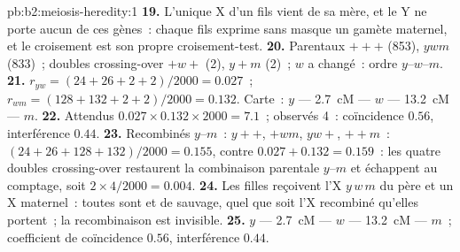 \begin{solution}{pb:b2:meiosis-heredity:1}
\textbf{19.} L'unique X d'un fils vient de sa mère, et le Y ne porte
aucun de ces gènes~: chaque fils exprime sans masque un gamète maternel,
et le croisement est son propre croisement-test.
\textbf{20.} Parentaux $+++$ (853), $ywm$ (833)~; doubles crossing-over
$+w+$ (2), $y+m$ (2)~; $w$ a changé~: ordre $y$--$w$--$m$.
\textbf{21.} $r_{yw} = (24 + 26 + 2 + 2)/2000 = 0.027$~; $r_{wm} = (128
+ 132 + 2 + 2)/2000 = 0.132$. Carte~: $y$ --- \qty{2.7}{cM} --- $w$ ---
\qty{13.2}{cM} --- $m$.
\textbf{22.} Attendus $0.027\times 0.132\times 2000 = 7.1$~; observés
4~: coïncidence $0.56$, interférence $0.44$.
\textbf{23.} Recombinés $y$--$m$~: $y++$, $+wm$, $yw+$, $++m$~: $(24 +
26 + 128 + 132)/2000 = 0.155$, contre $0.027 + 0.132 = 0.159$~: les
quatre doubles crossing-over restaurent la combinaison parentale
$y$--$m$ et échappent au comptage, soit $2\times 4/2000 = 0.004$.
\textbf{24.} Les filles reçoivent l'X $y\,w\,m$ du père et un X
maternel~: toutes sont  et de  sauvage, quel que
soit l'X recombiné qu'elles portent~; la recombinaison est invisible.
\textbf{25.} $y$ --- \qty{2.7}{cM} --- $w$ --- \qty{13.2}{cM} --- $m$~;
coefficient de coïncidence $0.56$, interférence $0.44$.
\end{solution}
